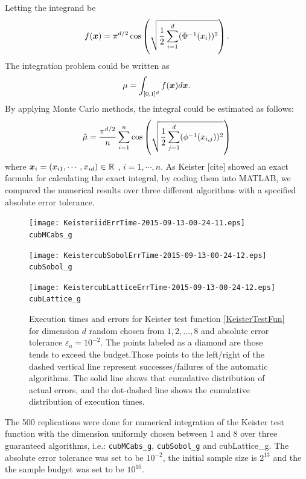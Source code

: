 \documentclass{iitthesis}
\begin{document}
Letting the integrand be 
\begin{equation}
f(\boldsymbol{x}) = \pi^{d/2} \cos \left( \sqrt{\frac{1}{2} \sum_{i=1}^d (\Phi^{-1} (x_i))^2}\right).
\end{equation}
The integration problem could be written as
\begin{equation}
\mu = \int_{[0,1]^d} f(\boldsymbol{x})d\boldsymbol{x}.
\end{equation}
By applying Monte Carlo methods, the integral could be estimated as follows:
\begin{align}
\hat{\mu} = \frac{\pi^{d/2}}{n}\sum_{i=1}^n \cos \left (\sqrt{\frac12 \sum_{j=1}^d (\phi^{-1}(x_{i,j}))^2}\right )
\end{align}
where $\boldsymbol{x}_i = (x_{i1},\cdots,x_{id}) \in \mathbb{R}$ , $i=1,\cdots, n.$
As Keister [cite] showed an exact formula for calculating the exact integral, by coding them into MATLAB, we compared the numerical results over three different algorithms with a specified absolute error tolerance.
\begin{figure}
\centering
\begin{minipage}{9cm} \centering \texttt{[image: KeisteriidErrTime-2015-09-13-00-24-11.eps]} \\ {\tt cubMCabs\_g} \end{minipage}
\begin{minipage}{7cm} \centering \texttt{[image: KeistercubSobolErrTime-2015-09-13-00-24-12.eps]} \\ {\tt cubSobol\_g} \end{minipage}
\begin{minipage}{7cm} \centering \texttt{[image: KeistercubLatticeErrTime-2015-09-13-00-24-12.eps]} \\ {\tt cubLattice\_g} \end{minipage}
\caption{Execution times and errors for Keister test function \eqref{KeisterTestFun} for dimension $d$ random chosen from $1, 2, \ldots, 8$ and absolute error tolerance $\varepsilon_a=10^{-2}$. The points labeled as a diamond are those tends to exceed the budget.Those points to the left/right of the dashed vertical line represent successes/failures of the automatic algorithms.  The solid line shows that cumulative distribution of actual errors, and the dot-dashed line shows the cumulative distribution of execution times. \label{fig:keistertestfunabstol}}
\end{figure}
The 500 replications were done for numerical integration of the Keister test function with the dimension uniformly chosen between 1 and 8 over three guaranteed algorithms, i.e.: {\tt cubMCabs\_g}, {\tt cubSobol\_g} and {cubLattice\_g}. The absolute error tolerance was set to be $10^{-2}$, the initial sample size is $2^{13}$ and the the sample budget was set to be $10^{10}$.
\end{document}
